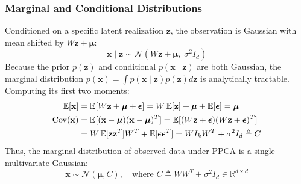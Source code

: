 \subsubsection{Marginal and Conditional Distributions}
Conditioned on a specific latent realization $\mathbf{z}$, the observation is Gaussian with mean shifted by $W\mathbf{z} + \boldsymbol{\mu}$:
\begin{equation}
\mathbf{x} \mid \mathbf{z} \sim \mathcal{N}(W\mathbf{z} + \boldsymbol{\mu}, \; \sigma^2 I_d)
\end{equation}
Because the prior $p(\mathbf{z})$ and conditional $p(\mathbf{x} \mid \mathbf{z})$ are both Gaussian, the marginal distribution $p(\mathbf{x}) = \int p(\mathbf{x} \mid \mathbf{z}) p(\mathbf{z}) d\mathbf{z}$ is analytically tractable. Computing its first two moments:
\begin{align}
\operatorname{\mathbb{E}}[\mathbf{x}] &= \operatorname{\mathbb{E}}[W\mathbf{z} + \boldsymbol{\mu} + \boldsymbol{\epsilon}] = W\operatorname{\mathbb{E}}[\mathbf{z}] + \boldsymbol{\mu} + \operatorname{\mathbb{E}}[\boldsymbol{\epsilon}] = \boldsymbol{\mu} \\
\operatorname{Cov}(\mathbf{x}) &= \operatorname{\mathbb{E}}[(\mathbf{x} - \boldsymbol{\mu})(\mathbf{x} - \boldsymbol{\mu})^T] = \operatorname{\mathbb{E}}[(W\mathbf{z} + \boldsymbol{\epsilon})(W\mathbf{z} + \boldsymbol{\epsilon})^T] \notag \\
&= W \operatorname{\mathbb{E}}[\mathbf{z}\mathbf{z}^T] W^T + \operatorname{\mathbb{E}}[\boldsymbol{\epsilon}\boldsymbol{\epsilon}^T] = W I_k W^T + \sigma^2 I_d \triangleq C
\end{align}
Thus, the marginal distribution of observed data under PPCA is a single multivariate Gaussian:
\begin{equation}
\mathbf{x} \sim \mathcal{N}(\boldsymbol{\mu}, C), \quad \text{where } C \triangleq W W^T + \sigma^2 I_d \in \mathbb{R}^{d \times d}
\label{eq:ppca_marginal}
\end{equation}

